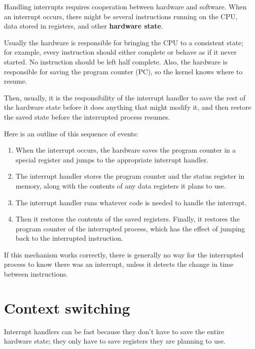 \documentclass[12pt]{book}
\begin{document}
Handling interrupts requires cooperation between hardware and
software.  When an interrupt occurs, there might be several
instructions running on the CPU, data stored in registers, and
other {\bf hardware state}.

Usually the hardware is responsible for bringing the CPU
to a consistent state; for example, every instruction should either
complete or behave as if it never started.  No instruction should
be left half complete.  Also, the hardware is responsible for
saving the program counter (PC), so the kernel knows where to
resume.

Then, usually, it is the responsibility of the interrupt handler
to save the rest of the hardware state before it does anything that
might modify it, and then restore the saved state before the interrupted
process resumes.

Here is an outline of this sequence of events:

\begin{enumerate}

\item When the interrupt occurs, the hardware saves the program
counter in a special register and jumps to the appropriate interrupt
handler.

\item The interrupt handler stores the program counter and the
status register in memory, along with the contents of any data
registers it plans to use.

\item The interrupt handler runs whatever code is needed to handle
the interrupt.

\item Then it restores the contents of the saved registers.  Finally,
it restores the program counter of the interrupted process, which
has the effect of jumping back to the interrupted instruction.

\end{enumerate}

If this mechanism works correctly, there is generally no way for
the interrupted process to know there was an interrupt, unless
it detects the change in time between instructions.


\section{Context switching}

Interrupt handlers can be fast because they don't have to save the
entire hardware state; they only have to save registers they are
planning to use.
\end{document}
